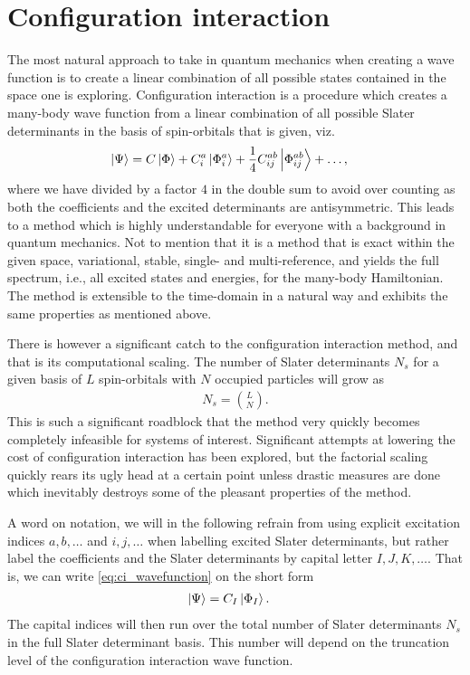\chapter{Configuration interaction}
    The most natural approach to take in quantum mechanics when creating a wave
    function is to create a linear combination of all possible states contained
    in the space one is exploring.
    Configuration interaction is a procedure which creates a many-body wave
    function from a linear combination of all possible Slater determinants in
    the basis of spin-orbitals that is given, viz.
    \begin{align}
        \ket{\Psi}
        &= C\ket{\Phi}
        + C^a_i\ket{\Phi^{a}_{i}}
        + \frac{1}{4}C^{ab}_{ij}\ket{\Phi^{ab}_{ij}}
        + \dots,
        \label{eq:ci_wavefunction}
    \end{align}
    where we have divided by a factor $4$ in the double sum to avoid over
    counting as both the coefficients and the excited determinants are
    antisymmetric.
    This leads to a method which is highly understandable for everyone with a
    background in quantum mechanics.
    Not to mention that it is a method that is exact within the given space,
    variational, stable, single- and multi-reference, and yields the full
    spectrum, i.e., all excited states and energies, for the many-body
    Hamiltonian.
    The method is extensible to the time-domain in a natural way and exhibits
    the same properties as mentioned above.

    There is however a significant catch to the configuration interaction
    method, and that is its computational scaling.
    The number of Slater determinants $N_{s}$ for a given basis of $L$
    spin-orbitals with $N$ occupied particles will grow as \cite{kvaal2017notes}
    \begin{align}
        N_{s} = \binom{L}{N}.
    \end{align}
    This is such a significant roadblock that the method very quickly becomes
    completely infeasible for systems of interest.
    Significant attempts at lowering the cost of configuration interaction has
    been explored, but the factorial scaling quickly rears its ugly head at a
    certain point unless drastic measures are done which inevitably destroys
    some of the pleasant properties of the method.

    A word on notation, we will in the following refrain from using explicit
    excitation indices $a, b, \dots$ and $i, j, \dots$ when labelling excited
    Slater determinants, but rather label the
    coefficients and the Slater determinants by capital letter $I, J, K,
    \dots$.
    That is, we can write \autoref{eq:ci_wavefunction} on the short form
    \begin{align}
        \ket{\Psi}
        &= C_{I}\ket{\Phi_I}.
    \end{align}
    The capital indices will then run over the total number of Slater
    determinants $N_s$ in the full Slater determinant basis.
    This number will depend on the truncation level of the configuration
    interaction wave function.

